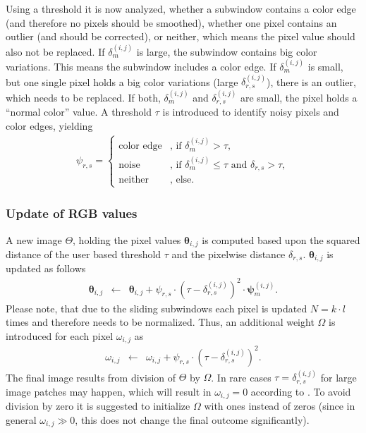 Using a threshold it is now analyzed, whether a subwindow contains a color edge (and therefore no pixels should be smoothed), whether one pixel contains an outlier (and should be corrected), or neither, which means the pixel value should also not be replaced.
If $\delta_m^{\left(i,j\right)}$ is large, the subwindow contains big color variations.
This means the subwindow includes a color edge.
If $\delta_m^{\left(i,j\right)}$ is small, but one single pixel holds a big color variations (large $\delta_{r,s}^{\left(i,j\right)}$), there is an outlier, which needs to be replaced.
If both, $\delta_m^{\left(i,j\right)}$ and $\delta_{r,s}^{\left(i,j\right)}$ are small, the pixel holds a ``normal color'' value.
A threshold $\tau$ is introduced to identify noisy pixels and color edges, yielding
\begin{eqnarray}
  \psi_{r,s} =  \begin{cases}
    \textrm{color\ edge} & \textrm{,\ if\ } \delta_m^{\left(i,j\right)} > \tau, \\
    \textrm{noise} & \textrm{,\ if\ } \delta_m^{\left(i,j\right)} \leq \tau \textrm{\ and\ } \delta_{r,s} > \tau, \\
    \textrm{neither} & \textrm{,\ else}.
  \end{cases} \label{eqn:decision_noise_edge}
\end{eqnarray}





\subsubsection{Update of RGB values}

A new image $\Theta$, holding the pixel values $\bm{\theta}_{i,j}$ is computed based upon the squared distance of the user based threshold $\tau$ and the pixelwise distance $\delta_{r,s}$. 
$\bm{\theta}_{i,j}$ is updated as follows
\begin{eqnarray}
  \bm{\theta}_{i,j} &\longleftarrow& \bm{\theta}_{i,j} + \psi_{r,s} \cdot \left( \tau - \delta_{r,s}^{\left(i,j\right)} \right)^2 \cdot \bm{\psi}_{m}^{\left(i,j\right)}.
\end{eqnarray}
Please note, that due to the sliding subwindows each pixel is updated $N= k \cdot l$ times and therefore needs to be normalized. Thus, an additional weight $\Omega$ is introduced for each pixel $\omega_{i,j}$ as
\begin{eqnarray}
  \omega_{i,j} &\longleftarrow& \omega_{i,j} + \psi_{r,s} \cdot \left( \tau - \delta_{r,s}^{\left(i,j\right)} \right)^2.
  \label{eq:method_weightupdate}
\end{eqnarray}
The final image results from division of $\Theta$ by $\Omega$. 
In rare cases $\tau = \delta_{r,s}^{\left(i,j\right)}$ for large image patches may happen, which will result in $\omega_{i,j} = 0$ according to .
To avoid division by zero it is suggested to initialize $\Omega$ with ones instead of zeros (since in general $\omega_{i,j} \gg 0$, this does not change the final outcome significantly).


